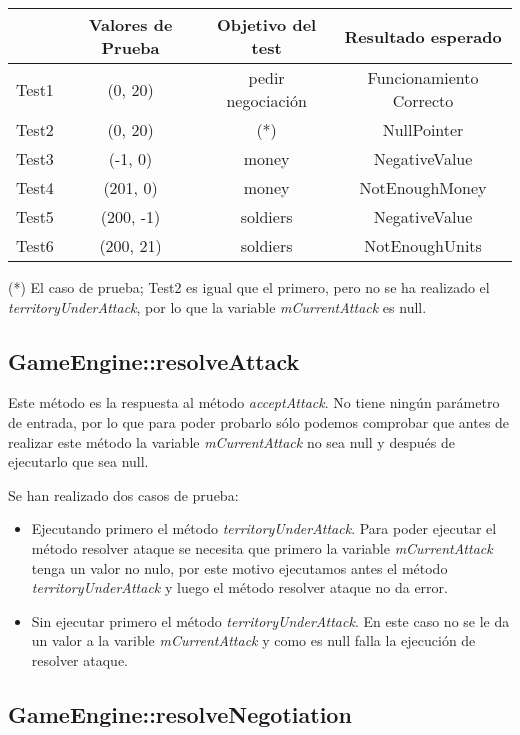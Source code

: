 {\footnotesize
\begin{longtable}[c]{lccc}
 & \textbf{Valores de Prueba} & \textbf{Objetivo del test} & \textbf{Resultado esperado} \\
\hline \hline
\endhead

Test1 & (0, 20) & pedir negociación & Funcionamiento Correcto\\
Test2 & (0, 20) & (*) & NullPointer\\
Test3 & (-1, 0) & money & NegativeValue\\
Test4 & (201, 0) & money & NotEnoughMoney\\
Test5 & (200, -1) & soldiers & NegativeValue\\
Test6 & (200, 21) & soldiers & NotEnoughUnits\\

\hline
\end{longtable}
}

(*) El caso de prueba; Test2 es igual que el primero, pero no se ha realizado el \textit{territoryUnderAttack}, por lo que la variable \textit{mCurrentAttack} es null.

\subsection{GameEngine::resolveAttack}

Este método es la respuesta al método \textit{acceptAttack}. No tiene ningún parámetro de entrada, por lo que para poder probarlo sólo podemos comprobar que antes de realizar este método la variable \textit{mCurrentAttack} no sea null y después de ejecutarlo que sea null.

Se han realizado dos casos de prueba:
\begin{itemize}
\item Ejecutando primero el método \textit{territoryUnderAttack}. Para poder ejecutar el método resolver ataque se necesita que primero la variable \textit{mCurrentAttack} tenga un valor no nulo, por este motivo ejecutamos antes el método \textit{territoryUnderAttack} y luego el método resolver ataque no da error.
\item Sin ejecutar primero el método \textit{territoryUnderAttack}. En este caso no se le da un valor a la varible \textit{mCurrentAttack} y como es null falla la ejecución de resolver ataque.
\end{itemize}

\subsection{GameEngine::resolveNegotiation}

